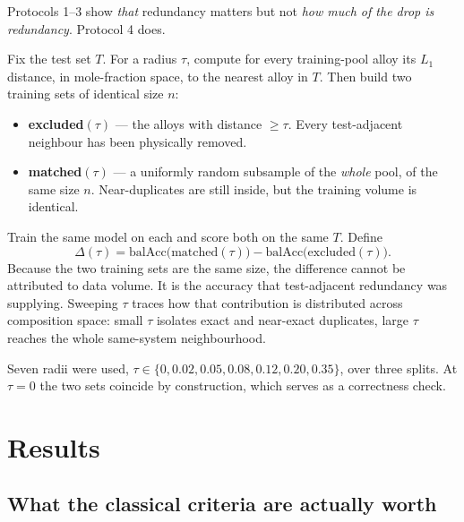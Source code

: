 \documentclass[11pt]{article}
\begin{document}
Protocols 1--3 show \emph{that} redundancy matters but not \emph{how much of the drop is redundancy}. Protocol 4 does.

Fix the test set $T$. For a radius $\tau$, compute for every training-pool alloy its $L_1$ distance, in mole-fraction space, to the nearest alloy in $T$. Then build two training sets of identical size $n$:

\begin{itemize}
\item \textbf{excluded$(\tau)$} --- the alloys with distance $\ge \tau$. Every test-adjacent neighbour has been physically removed.
\item \textbf{matched$(\tau)$} --- a uniformly random subsample of the \emph{whole} pool, of the same size $n$. Near-duplicates are still inside, but the training volume is identical.
\end{itemize}

Train the same model on each and score both on the same $T$. Define
\begin{equation}
\Delta(\tau) = \mathrm{balAcc}\big(\mathrm{matched}(\tau)\big) - \mathrm{balAcc}\big(\mathrm{excluded}(\tau)\big).
\end{equation}
Because the two training sets are the same size, the difference cannot be attributed to data volume. It is the accuracy that test-adjacent redundancy was supplying. Sweeping $\tau$ traces how that contribution is distributed across composition space: small $\tau$ isolates exact and near-exact duplicates, large $\tau$ reaches the whole same-system neighbourhood.

Seven radii were used, $\tau \in \{0, 0.02, 0.05, 0.08, 0.12, 0.20, 0.35\}$, over three splits. At $\tau = 0$ the two sets coincide by construction, which serves as a correctness check.

\section{Results}

\subsection{What the classical criteria are actually worth}
\end{document}
